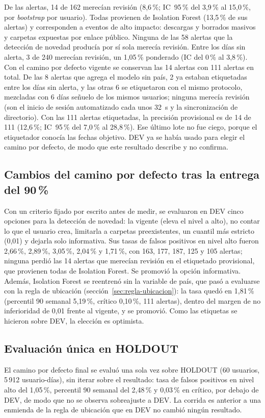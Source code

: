 De las alertas, 14 de 162 merecían revisión (8,6\,\%; IC~95\,\% del 3,9\,\% al 15,0\,\%, por \emph{bootstrap} por usuario). Todas provienen de Isolation Forest (13,5\,\% de sus alertas) y corresponden a eventos de alto impacto: descargas y borrados masivos y carpetas expuestas por enlace público. Ninguna de las 58 alertas que la detección de novedad producía por sí sola merecía revisión. Entre los días sin alerta, 3 de 240 merecían revisión, un 1,05\,\% ponderado (IC del 0\,\% al 3,8\,\%). Con el camino por defecto vigente se conservan las 14 alertas con 111 alertas en total. De las 8 alertas que agrega el modelo sin país, 2 ya estaban etiquetadas entre los días sin alerta, y las otras 6 se etiquetaron con el mismo protocolo, mezcladas con 6 días señuelo de los mismos usuarios; ninguna merecía revisión (son el inicio de sesión automatizado cada unos 32~s y la sincronización de directorio). Con las 111 alertas etiquetadas, la precisión provisional es de 14 de 111 (12,6\,\%; IC~95\,\% del 7,0\,\% al 28,8\,\%). Ese último lote no fue ciego, porque el etiquetador conocía las fechas objetivo. DEV ya se había usado para elegir el camino por defecto, de modo que este resultado describe y no confirma.

\subsection{Cambios del camino por defecto tras la entrega del 90\,\%}
\label{sec:que-cambiar-primero}
Con un criterio fijado por escrito antes de medir, se evaluaron en DEV cinco opciones para la detección de novedad: la vigente (eleva el nivel a alto), no contar lo que el usuario crea, limitarla a carpetas preexistentes, un cuantil más estricto (0,01) y dejarla solo informativa. Sus tasas de falsos positivos en nivel alto fueron 2,66\,\%, 2,89\,\%, 3,05\,\%, 2,04\,\% y 1,71\,\%, con 163, 177, 187, 125 y 105 alertas; ninguna perdió las 14 alertas que merecían revisión en el etiquetado provisional, que provienen todas de Isolation Forest. Se promovió la opción informativa. Además, Isolation Forest se reentrenó sin la variable de país, que pasó a evaluarse con la regla de ubicación (sección~\ref{sec:regla-ubicacion}): la tasa quedó en 1,81\,\% (percentil 90 semanal 5,19\,\%, crítico 0,10\,\%, 111 alertas), dentro del margen de no inferioridad de 0,01 frente al vigente, y se promovió. Como las etiquetas se hicieron sobre DEV, la elección es optimista.

\subsection{Evaluación única en HOLDOUT}
\label{sec:holdout-default}
El camino por defecto final se evaluó una sola vez sobre HOLDOUT (60 usuarios, 5\,912 usuario-días), sin iterar sobre el resultado: tasa de falsos positivos en nivel alto del 1,05\,\%, percentil 90 semanal del 2,48\,\% y 0,03\,\% en crítico, por debajo de DEV, de modo que no se observa sobreajuste a DEV. La corrida es anterior a una enmienda de la regla de ubicación que en DEV no cambió ningún resultado.

